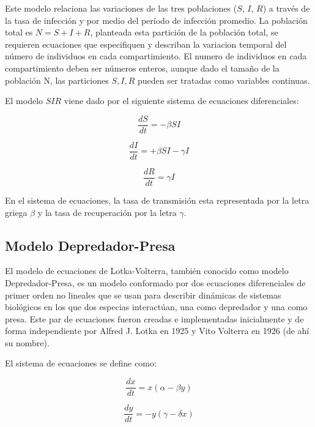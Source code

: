\documentclass[a4paper,12pt]{article}
\begin{document}
Este modelo relaciona las variaciones de las tres poblaciones ($S$, $I$, $R$) a través de la tasa de infección y por medio del período de infección promedio. La población total es $N = S+I+R$, planteada esta partición de la población total, se requieren ecuaciones que especifiquen y describan la variacion temporal del número de individuos en cada compartimiento. El numero de individuos en cada compartimiento deben ser números enteros, aunque dado el tamaño de la población N, las particiones $S, I, R$ pueden ser tratadas como variables continuas.\par

El modelo $SIR$ viene dado por el siguiente sistema de ecuaciones diferenciales:\par

\[ \frac{dS}{dt} = -\beta SI \]

\vspace{-1em}

\[ \frac{dI}{dt} = + \beta SI - \gamma I \]

\vspace{-1em}

\[ \frac{dR}{dt} = \gamma I \]

En el sistema de ecuaciones, la tasa de transmisión esta representada por la letra griega $\beta$ y la tasa de recuperación por la letra $\gamma$. \par

\subsection{Modelo Depredador-Presa}

 El modelo de ecuaciones de Lotka-Volterra, también conocido como modelo Depredador-Presa, es un modelo conformado por dos ecuaciones diferenciales de primer orden no lineales que se usan para describir dinámicas de sistemas biológicos en los que dos especias interactúan, una como depredador y una como presa. Este par de ecuaciones fueron creadas e implementadas inicialmente y de forma independiente por Alfred J. Lotka en 1925 y Vito Volterra en 1926 (de ahí su nombre).\par
 
 El sistema de ecuaciones se define como: \par

\[ \frac{dx}{dt}  = x(\alpha - \beta y) \]

\vspace{-1em}

\[ \frac{dy}{dt} = -y(\gamma -\delta x) \]
\end{document}
